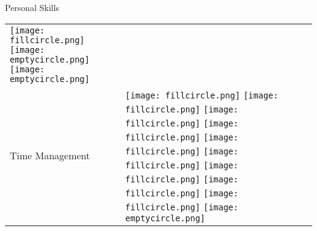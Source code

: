 \documentclass{resume}
\begin{document}
\begin{rSection}{Personal Skills}
\begin{table}[h!]
\begin{tabular}{p{10cm}p{6cm}}
    \texttt{[image: fillcircle.png]} 
    \texttt{[image: emptycircle.png]} 
	\texttt{[image: emptycircle.png]} \\
 	Time Management & 
 	\texttt{[image: fillcircle.png]} 
    \texttt{[image: fillcircle.png]} 
    \texttt{[image: fillcircle.png]}
    \texttt{[image: fillcircle.png]} 
    \texttt{[image: fillcircle.png]}
    \texttt{[image: fillcircle.png]} 
    \texttt{[image: fillcircle.png]}
    \texttt{[image: fillcircle.png]} 
    \texttt{[image: fillcircle.png]} 
	\texttt{[image: emptycircle.png]} \\
  \end{tabular}
\end{table}
\end{rSection}
\end{document}
